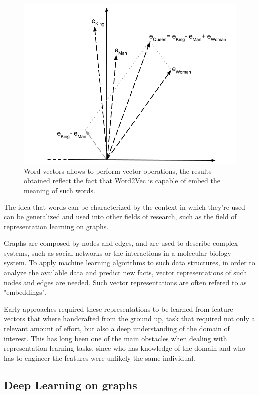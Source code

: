 \documentclass[%
    corpo=13.5pt,
    twoside,
    oldstyle,
    tipotesi=magistrale,
    greek,
    evenboxes
]{toptesi}
\begin{document}
\begin{figure}[h]
    \centering
    \includegraphics[scale=0.4]{img/word2vec.png}
    \caption{
        Word vectors allows to perform vector operations, the results
        obtained reflect the fact that Word2Vec is capable of embed the
        meaning of such words.
    }
    \label{fig:word2vec}
    \end{figure}

The idea that words can be characterized by the context in which they're used
can be generalized and used into other fields of research, such as
the field of representation learning on graphs.

Graphs are composed by nodes and edges, and are used to describe complex
systems, such as social networks or the interactions in a molecular biology
system. To apply machine learning algorithms to such data structures, in order
to analyze the available data and predict new facts, vector representations of
such nodes and edges are needed. Such vector representations are often
refered to as "embeddings".

Early approaches required these representations to be learned from feature
vectors that where handcrafted from the ground up, task that required not
only a relevant amount of effort, but also a deep understanding of the domain
of interest. This has long been one of the main obstacles when dealing with
representation learning tasks, since who has knowledge of the domain and who
has to engineer the features were unlikely the same individual.


\subsection{Deep Learning on graphs}
\end{document}
